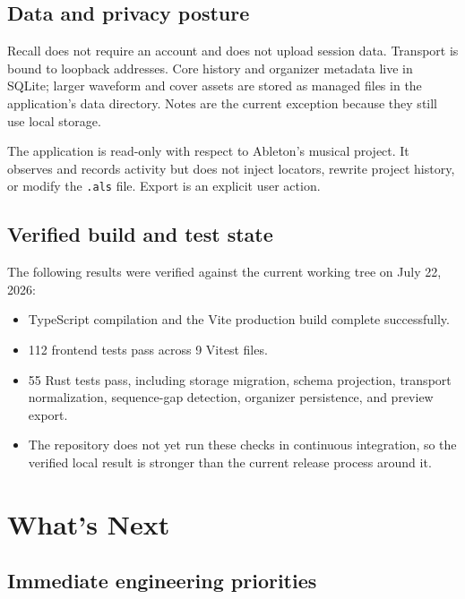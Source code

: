 \documentclass[11pt,letterpaper]{article}
\begin{document}
\subsection{Data and privacy posture}

Recall does not require an account and does not upload session data. Transport is
bound to loopback addresses. Core history and organizer metadata live in SQLite;
larger waveform and cover assets are stored as managed files in the application's
data directory. Notes are the current exception because they still use local storage.

The application is read-only with respect to Ableton's musical project. It observes
and records activity but does not inject locators, rewrite project history, or modify
the \texttt{.als} file. Export is an explicit user action.

\subsection{Verified build and test state}

The following results were verified against the current working tree on July 22, 2026:

\begin{itemize}
  \item TypeScript compilation and the Vite production build complete successfully.
  \item 112 frontend tests pass across 9 Vitest files.
  \item 55 Rust tests pass, including storage migration, schema projection, transport
        normalization, sequence-gap detection, organizer persistence, and preview export.
  \item The repository does not yet run these checks in continuous integration, so the
        verified local result is stronger than the current release process around it.
\end{itemize}

\section{What's Next}

\subsection{Immediate engineering priorities}
\end{document}
